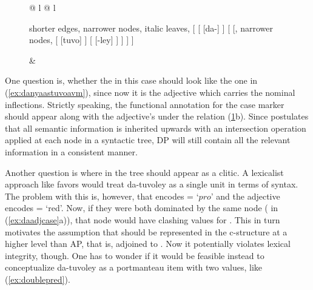 \begin{figure}
\ex{}
\begin{tabular}[t]{@{} l @{\quad} l}
\tl\quad\label{ex:daadjcase}\ques%
\begin{forest} shorter edges, narrower nodes, italic leaves,
[{}
		[\anno{Cl}
			[da-]
		]
		[{\anno[\elem{\Adjc}]{AP}}
				[, narrower nodes,
					[\anno{A\tsub{stem}}
						[tuvo]
					]
					[\anno{A\tsub{infl}}
						[-ley]
					]
				]
		]
]
\end{forest}

&

\tl\quad\label{ex:daadjcaseavm} \ques{}
\end{tabular}
\xe
\end{figure}

One question is, whether the \Avm{} in this case should look like the one in
(\ref{ex:danyaastuvoavm}), since now it is the adjective which carries the
nominal inflections. Strictly speaking, the functional annotation for the
case marker should appear along with the adjective's \Pred{} under the
\Adjc{} relation (\ref{ex:daadjcaseavm}b). Since \Lfg{} postulates that all
semantic information is inherited upwards with an intersection operation
applied at each node in a syntactic tree, DP will still contain all the
relevant information in a consistent manner.

Another question is where in the tree  should appear as a clitic.
A lexicalist approach like \Lfg{} favors would treat 
{da-tuvoley} as a single unit in terms of syntax. The problem with this is,
however, that  encodes \ups{\Pred} = `$pro$' and the adjective
encodes \ups{\Pred} = `red'. Now, if they were both dominated by the same node
( in (\ref{ex:daadjcase}a)), that node would have clashing values for
\Pred{}. This in turn motivates the assumption that  should be
represented in the c-structure at a higher level than AP, that is, adjoined to
. Now it potentially violates lexical integrity, though. One has to
wonder if it would be feasible instead to conceptualize 
{da-tuvoley} as a portmanteau item with two \Pred{} values, like
(\ref{ex:doublepred}).

